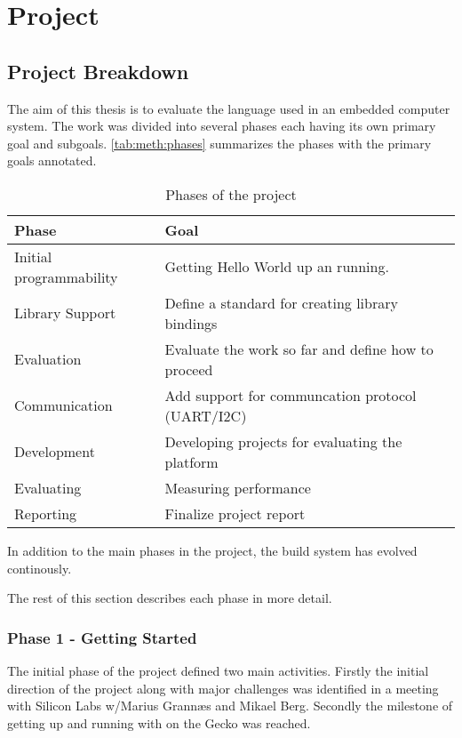 \section{Project}

\subsection{Project Breakdown}

The aim of this thesis is to evaluate the \rust language used in an embedded computer system.
The work was divided into several phases each having its own primary goal and subgoals.
\autoref{tab:meth:phases} summarizes the phases with the primary goals annotated.

\begin{table}[H]
  \begin{center}
    \begin{tabular}{|l|l|}
      \hline
      Phase&Goal \\
      \hline
      \hline
      Initial programmability&Getting Hello World up an running.\\
      \hline
      Library Support&Define a standard for creating library bindings\\
      \hline
      Evaluation&Evaluate the work so far and define how to proceed\\
      \hline
      Communication&Add support for communcation protocol (UART/I2C)\\
      \hline
      Development&Developing projects for evaluating the platform\\
      \hline
      Evaluating&Measuring performance\\
      \hline
      Reporting&Finalize project report\\
      \hline
    \end{tabular}
  \end{center}
  \caption{Phases of the project}
  \label{tab:meth:phases}
\end{table}

In addition to the main phases in the project, the build system has evolved continously.

The rest of this section describes each phase in more detail.

\subsubsection{Phase 1 - Getting Started}
The initial phase of the project defined two main activities.
Firstly the initial direction of the project along with major challenges was identified in a meeting with Silicon Labs w/Marius Grannæs and Mikael Berg.
Secondly the milestone of getting up and running with \rust on the Gecko was reached.

